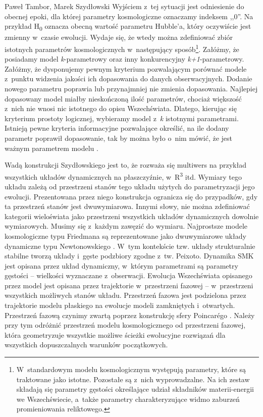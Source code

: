 \begin{artplenv2auth}{Paweł Tambor, Marek Szydłowski}
Wyjściem z~tej sytuacji jest odniesienie do obecnej epoki, dla której parametry kosmologiczne oznaczamy indeksem ,,0''. Na przykład H\textsubscript{0} oznacza obecną wartość parametru Hubble'a, który oczywiście jest zmienny w~czasie ewolucji. Wydaje się, że wtedy można zdefiniować zbiór istotnych parametrów kosmologicznych w~następujący sposób\footnote{W~standardowym modelu kosmologicznym występują parametry, które są traktowane jako istotne. Pozostałe są z~nich wyprowadzalne. Na ich zestaw składają się parametry gęstości określające udział składników materii-energii we Wszechświecie, a~także parametry charakteryzujące widmo zaburzeń promieniowania reliktowego.}. Załóżmy, że posiadamy model \textit{k}-parametrowy oraz inny konkurencyjny \textit{k+1}-parametrowy. Załóżmy, że dysponujemy pewnym kryterium pozwalającym porównać modele z~punktu widzenia jakości ich dopasowania do danych obserwacyjnych. Dodanie nowego parametru poprawia lub przynajmniej nie zmienia dopasowania. Najlepiej dopasowany model miałby nieskończoną ilość parametrów, chociaż większość z~nich nie wnosi nic istotnego do opisu Wszechświata. Dlatego, kierując się kryterium prostoty logicznej, wybieramy model z~\textit{k} istotnymi parametrami. Istnieją pewne kryteria informacyjne pozwalające określić, na ile dodany parametr poprawił dopasowanie, tak by można było o~nim mówić, że jest ważnym parametrem modelu
\parencite[][]{szydlowski_towards_2007}.%


Wadą konstrukcji Szydłowskiego jest to, że rozważa się multiwers na przykład wszystkich układów dynamicznych na płaszczyźnie, w~R\textsuperscript{3} itd. Wymiary tego układu zależą od przestrzeni stanów tego układu użytych do parametryzacji jego ewolucji. Prezentowana przez niego konstrukcja ogranicza się do przypadków, gdy ta przestrzeń stanów jest dwuwymiarowa. Innymi słowy, nie można zdefiniować kategorii wieloświata jako przestrzeni wszystkich układów dynamicznych dowolnie wymiarowych. Musimy się z~każdym zawęzić do wymiaru. Najprostsze modele kosmologiczne typu Friedmana są reprezentowane jako dwuwymiarowe układy dynamiczne typu Newtonowskiego
\parencites[][]{szydlowski_towards_2007}[por.][]{szydlowski_filozoficzne_1983}. %
 W~tym kontekście tzw. układy strukturalnie stabilne tworzą układy i~gęste podzbiory zgodne z~tw. Peixoto. Dynamika SMK jest opisana przez układ dynamiczny, w~którym parametrami są parametry gęstości -- wielkości wyznaczane z~obserwacji. Ewolucja Wszechświata opisanego przez model jest opisana przez trajektorie w~przestrzeni fazowej -- w~przestrzeni wszystkich możliwych stanów układu. Przestrzeń fazowa jest podzielona przez trajektorie modelu płaskiego na ewolucje modeli zamkniętych i~otwartych. Przestrzeń fazową czynimy zwartą poprzez konstrukcję sfery Poincarégo
\parencite{perko_differential_1996}.
 Należy przy tym odróżnić przestrzeń modelu kosmologicznego od przestrzeni fazowej, która geometryzuje wszystkie możliwe ścieżki ewolucyjne rozwiązań dla wszystkich dopuszczalnych warunków początkowych.


\end{artplenv2auth}
